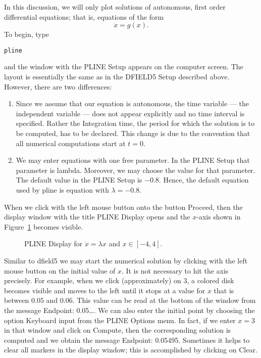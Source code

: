 In this discussion, we will only plot solutions of autonomous,
first order differential equations; that is, equations of the
form
\[
\dot{x} = g(x).
\]
To begin, type
\begin{verbatim}
pline
\end{verbatim}
and the window with the {\sf PLINE Setup} appears on the
computer screen.  The layout is essentially the same as in the
{\sf DFIELD5 Setup} described above.  However, there are two
differences:
\begin{enumerate}
\item Since we assume that our equation is autonomous, the time
variable --- the independent variable --- does
not appear explicitly and no time interval is specified.  Rather
the {\sf Integration time}, the period for which the solution is
to be computed, has to be declared.  This change is due to the
convention that all numerical computations start at $t=0$.
\item We may enter equations with one free parameter.
In the {\sf PLINE Setup} that parameter is {\sf lambda}.
Moreover, we may choose the value for that parameter.  The
default value in the {\sf PLINE Setup} is $-0.8$.  Hence, the
default equation used by {\sf pline} is equation
 with $\lambda = -0.8$.
\end{enumerate}

When we click with the left mouse button onto the button {\sf
Proceed}, then the display window with the title {\sf PLINE
Display} opens and the $x$-axis shown in Figure~\ref{pl_dsp1}
becomes visible.

\begin{figure}[htb]
     \centerline{%
     }
     \caption{{\sf PLINE Display} for $\dot{x}=\lambda x$
                and $x\in [-4,4]$.}
     \label{pl_dsp1}
\end{figure}

Similar to {\sf dfield5} we may start the numerical solution by
clicking with the left mouse button on the initial value of $x$.
It is not necessary to hit the axis precisely.  For example,
when we click (approximately) on $3$, a colored disk becomes
visible and moves to the left until it stops at a value for $x$
that is between $0.05$ and $0.06$.  This value can be read at
the bottom of the window from the message {\sf Endpoint:
0.05\ldots}.  We can also enter the initial point by choosing
the option {\sf Keyboard input} from the {\sf PLINE Options}
menu.  In fact, if we enter $x=3$ in that window and click on
{\sf Compute}, then the corresponding solution is computed and
we obtain the message {\sf Endpoint: 0.05495}.  Sometimes it
helps to clear all markers in the display window; this is
accomplished by clicking on {\sf Clear}.

